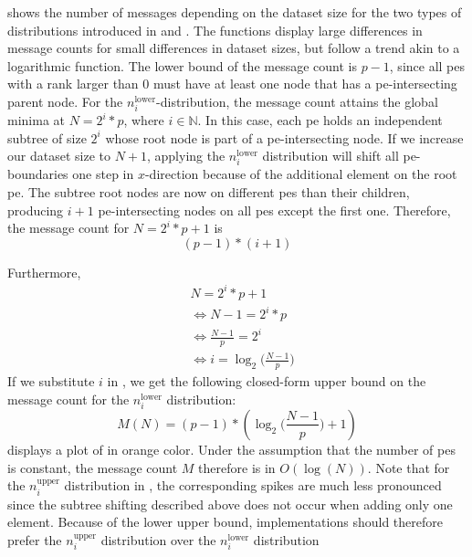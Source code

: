  shows the number of messages depending on the dataset size for the two types of distributions introduced in  and .
The functions display large differences in message counts for small differences in dataset sizes, but follow a trend akin to a logarithmic function.
The lower bound of the message count is $p - 1$, since all \glspl{pe} with a rank larger than $0$ must have at least one node that has a \gls{pe}-intersecting parent node.
For the $n_i^\textrm{lower}$-distribution, the message count attains the global minima at $N = 2^i * p$, where $i \in \mathbb{N}$.
In this case, each \gls{pe} holds an independent subtree of size $2^i$ whose root node is part of a \gls{pe}-intersecting node.
If we increase our dataset size to $N+1$, applying the $n_i^\textrm{lower}$ distribution will shift all \gls{pe}-boundaries one step in $x$-direction because of the additional element on the root \gls{pe}.
The subtree root nodes are now on different \glspl{pe} than their children, producing $i + 1$ \gls{pe}-intersecting nodes on all \glspl{pe} except the first one.
Therefore, the message count for $N = 2^i * p + 1$ is 
\begin{equation}
\label{eq:messageCountI}
(p - 1) * (i + 1)
\end{equation}

Furthermore,
\begin{align*}
&N = 2^i * p + 1 \\ 
&\Leftrightarrow N - 1 = 2^i * p \\
&\Leftrightarrow \frac{N - 1}{p} = 2^i \\
&\Leftrightarrow i = \log_2 \big(\frac{N - 1}{p}\big)
\end{align*}
If we substitute $i$ in , we get the following closed-form upper bound on the message count for the $n_i^\textrm{lower}$ distribution:
\begin{equation}
\label{eq:upperBoundLowerDistribution}
M(N) = (p - 1) * (\log_2 \Big( \frac{N - 1}{p} \Big) + 1)
\end{equation}
 displays a plot of   in orange color.
Under the assumption that the number of \glspl{pe} is constant, the message count $M$ therefore is in $O(\log(N))$.
Note that for the $n_i^\textrm{upper}$ distribution in , the corresponding spikes are much less pronounced since the subtree shifting described above does not occur when adding only one element.
Because of the lower upper bound, implementations should therefore prefer the $n_i^\textrm{upper}$ distribution over the $n_i^\textrm{lower}$ distribution
